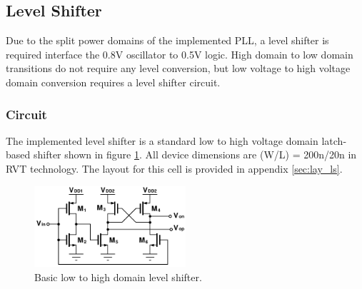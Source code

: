 




	\FloatBarrier
	\vspace{-1.5em}
	\subsection{Level Shifter}
	Due to the split power domains of the implemented PLL, a level shifter is required interface the 0.8V oscillator to 0.5V logic. High domain to low domain transitions do not require any level conversion, but low voltage to high voltage domain conversion requires a level shifter circuit. 

		\vspace{-1em}
		\subsubsection{Circuit}
			The implemented level shifter is a standard low to high voltage domain latch-based shifter \cite{weste_harris_2011} shown in figure \ref{fig:level_shifter}. All device dimensions are (W/L) = 200n/20n in RVT technology. The layout for this cell is provided in appendix \ref{sec:lay_ls}.
			
			\vspace{-0.5em}
			\begin{figure}[htb!]
			        \centering
			        \includegraphics[width=0.5\textwidth, angle=0]{./figs/design/level_shift}
			    \caption{Basic low to high domain level shifter.}
			    \label{fig:level_shifter}
			\end{figure}





